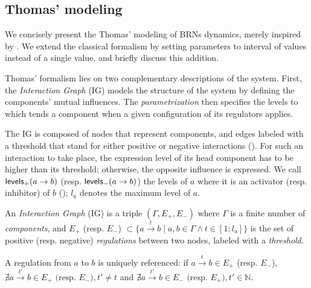 \subsection{Thomas' modeling}
We concisely present the Thomas' modeling of BRNs dynamics, merely inspired by
\cite{Richard06,BernotSemBRN}.
We extend the classical formalism by setting parameters to interval of values instead of a single
value, and briefly discuss this addition.

Thomas' formalism lies on two complementary descriptions of the system. First, the
\emph{Interaction Graph} (IG) models the structure of the system by defining the components'
mutual influences.
The \emph{parametrization} then specifies the levels to which tends a component when a given
configuration of its regulators applies.

The IG is composed of nodes that represent components, and edges labeled with a threshold that stand
for either positive or negative interactions ().
For such an interaction to take place, the expression level of its head component has to be higher than its threshold; otherwise, the opposite influence is expressed.
We call $\mathsf{levels}_+(a\rightarrow b)$ (resp. $\mathsf{levels}_-(a\rightarrow b)$) the levels of $a$ where it is an
activator (resp. inhibitor) of $b$ ();
$l_a$ denotes the maximum level of $a$.

\begin{definition}
\label{def:ig}
An \emph{Interaction Graph} (IG) is a triple $(\Gamma, E_+, E_-)$ where $\Gamma$ is a finite number of \emph{components},
and $E_+$ (resp. $E_-$) $\subset \{a \xrightarrow{t} b \mid a, b \in \Gamma \wedge t \in [1; l_a]\}$
is the set of positive (resp. negative) \emph{regulations} between two nodes, labeled with a \emph{threshold}.

A regulation from $a$ to $b$ is uniquely referenced:
if $a \xrightarrow{t} b \in E_+$ (resp. $E_-$),
$\nexists a \xrightarrow{t'} b \in E_+ \text{ (resp. $E_-$)}, t' \neq t$
and $\nexists a \xrightarrow{t'} b \in E_-\text{ (resp. $E_+$)}, t' \in \mathbb{N}$.
\end{definition}

